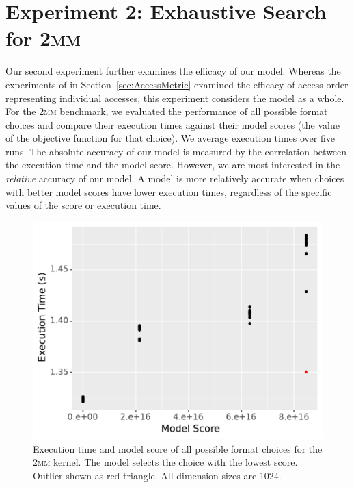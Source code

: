 \documentclass[sigconf,review=true]{acmart}
\begin{document}
\section{Experiment 2:  Exhaustive Search for \textsc{2mm}}

Our second experiment further examines the efficacy of our model. 
Whereas the experiments of in Section~\ref{sec:AccessMetric} examined the efficacy of access order representing individual accesses, this experiment considers the model as a whole.
For the \textsc{2mm} benchmark, we evaluated the performance of all possible format choices and compare their execution times against their model scores (the value of the objective function for that choice).
We average execution times over five runs.
The absolute accuracy of our model is measured by the correlation between the execution time and the model score.
However, we are most interested in the \textit{relative} accuracy of our model.
A model is more relatively accurate when choices with better model scores have lower execution times, regardless of the specific values of the score or execution time.

\begin{figure}
	\includegraphics[width=\columnwidth]{2mm-all.pdf}
	\caption{Execution time and model score of all possible format choices for the \textsc{2mm} kernel. The model selects the choice with the lowest score. Outlier shown as red triangle. All dimension sizes are 1024.}
	\label{2MMAllChoices}
\end{figure}
\end{document}
